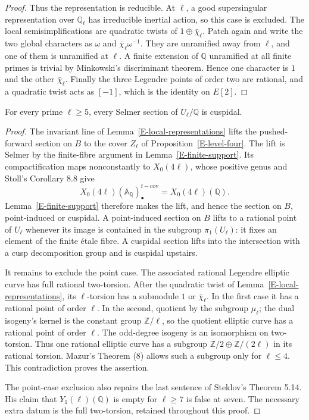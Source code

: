 \begin{proof}
Thus the representation is reducible.
At $\ell$, a good supersingular representation
over $\mathbb Q_\ell$ has irreducible inertial
action, so this case is excluded. The local
semisimplifications are quadratic twists of
$1\oplus\bar\chi_\ell$. Patch again and write
the two global characters as $\omega$ and
$\bar\chi_\ell\omega^{-1}$.
They are unramified away from $\ell$, and one
of them is unramified at $\ell$. A finite
extension of $\mathbb Q$ unramified at all
finite primes is trivial by Minkowski's
discriminant theorem. Hence one character is
$1$ and the other $\bar\chi_\ell$.
Finally the three Legendre points of order
two are rational, and a quadratic twist acts
as $[-1]$, which is the identity on $E[2]$.
\end{proof}

\begin{theorem}
\label{E-selmer-primes}
For every prime $\ell\geq5$, every Selmer section
of $U_\ell/\mathbb Q$ is cuspidal.
\end{theorem}
\begin{proof}
The invariant line of Lemma~\ref{E-local-representations}
lifts the pushed-forward section on $B$ to the
cover $Z_\ell$ of Proposition~\ref{E-level-four}.
The lift is Selmer by the finite-fibre argument
in Lemma~\ref{E-finite-support}.
Its compactification maps nonconstantly to
$X_0(4\ell)$, whose positive genus and Stoll's
Corollary 8.8 give
\[
 X_0(4\ell)(\mathbb A_{\mathbb Q})_\bullet^{\mathrm{f-cov}}
        =X_0(4\ell)(\mathbb Q).
\]
Lemma~\ref{E-finite-support} therefore makes the
lift, and hence the section on $B$, point-induced
or cuspidal. A point-induced section on $B$
lifts to a rational point of $U_\ell$ whenever
its image is contained in the subgroup
$\pi_1(U_\ell)$: it fixes an element of the
finite étale fibre. A cuspidal section lifts
into the intersection with a cusp decomposition
group and is cuspidal upstairs.

It remains to exclude the point case.
The associated rational Legendre elliptic
curve has full rational two-torsion.
After the quadratic twist of
Lemma~\ref{E-local-representations}, its
$\ell$-torsion has a submodule $1$ or
$\bar\chi_\ell$. In the first case it has a
rational point of order $\ell$. In the second,
quotient by the subgroup $\mu_\ell$; the
dual isogeny's kernel is the constant group
$\mathbb Z/\ell$, so the quotient elliptic
curve has a rational point of order $\ell$.
The odd-degree isogeny is an isomorphism on
two-torsion. Thus one rational elliptic curve
has a subgroup
$\mathbb Z/2\oplus\mathbb Z/(2\ell)$ in its
rational torsion. Mazur's Theorem (8)
allows such a subgroup only for $\ell\leq4$.
This contradiction proves the assertion.

The point-case exclusion also repairs the
last sentence of Steklov's Theorem 5.14.
His claim that $Y_1(\ell)(\mathbb Q)$ is empty
for $\ell\geq7$ is false at seven.
The necessary extra datum is the full
two-torsion, retained throughout this proof.
\end{proof}

